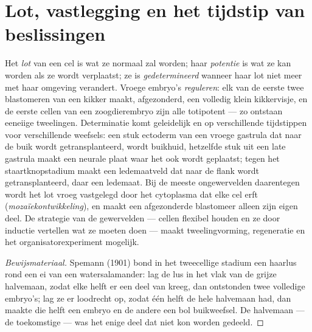 \section{Lot, vastlegging en het tijdstip van beslissingen}

\begin{proposition}\label{prop:b2:vertebrate-development:commitment}
Het \emph{lot} van een cel is wat ze normaal zal worden; haar
\emph{potentie} is wat ze kan worden als ze wordt verplaatst; ze is
\emph{gedetermineerd} wanneer haar lot niet meer met haar omgeving
verandert. Vroege embryo's \emph{reguleren}: elk van de eerste twee
blastomeren van een kikker maakt, afgezonderd, een volledig klein
kikkervisje, en de eerste cellen van een zoogdierembryo zijn alle
totipotent --- zo ontstaan eeneiige tweelingen. Determinatie komt
geleidelijk en op verschillende tijdstippen voor verschillende weefsels:
een stuk ectoderm van een vroege gastrula dat naar de buik wordt
getransplanteerd, wordt buikhuid, hetzelfde stuk uit een late gastrula
maakt een neurale plaat waar het ook wordt geplaatst; tegen het
staartknopstadium maakt een ledemaatveld dat naar de flank wordt
getransplanteerd, daar een ledemaat. Bij de meeste ongewervelden daarentegen
wordt het lot vroeg vastgelegd door het cytoplasma dat elke cel erft
(\emph{mozaïekontwikkeling}), en maakt een afgezonderde blastomeer alleen
zijn eigen deel. De strategie van de gewervelden --- cellen flexibel houden
en ze door inductie vertellen wat ze moeten doen --- maakt tweelingvorming,
regeneratie en het organisatorexperiment mogelijk.
\end{proposition}
\begin{proof}[Bewijsmateriaal]
Spemann (1901) bond in het tweecellige stadium een haarlus rond een ei van
een watersalamander: lag de lus in het vlak van de grijze halvemaan, zodat
elke helft er een deel van kreeg, dan ontstonden twee volledige embryo's;
lag ze er loodrecht op, zodat één helft de hele halvemaan had, dan maakte
die helft een embryo en de andere een bol buikweefsel. De halvemaan --- de
toekomstige  --- was het enige deel dat niet kon worden
gedeeld.
\end{proof}

